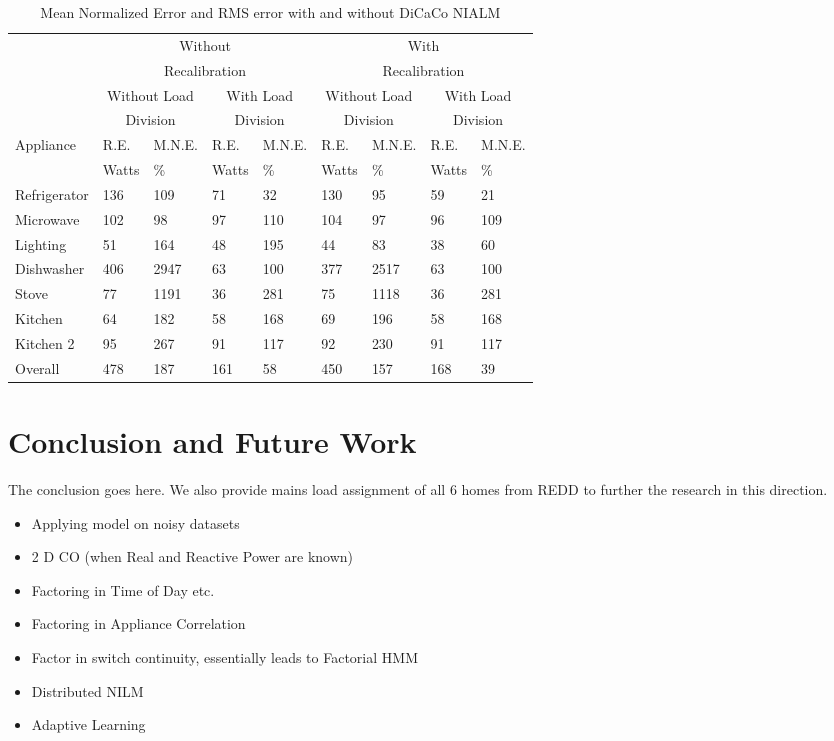 \documentclass[conference]{IEEEtran}
\begin{document}
\begin{table}
\caption{Mean Normalized Error and RMS error with and without DiCaCo NIALM}
\label{tab:results}
\begin{tabular}{|p{30pt}|p{12pt}|p{14pt}|p{12pt}|p{14pt}|p{12pt}|p{14pt}|p{12pt}|p{14pt}|}
\hline
&\multicolumn{4}{|c|}{Without}&\multicolumn{4}{|c|}{With}\\
&\multicolumn{4}{|c|}{Recalibration}&\multicolumn{4}{|c|}{Recalibration}\\
\hline
&\multicolumn{2}{|c|}{Without Load}&\multicolumn{2}{|c|}{With Load}&\multicolumn{2}{|c|}{Without Load}&\multicolumn{2}{|c|}{With Load}\\
&\multicolumn{2}{|c|}{Division}&\multicolumn{2}{|c|}{Division}&\multicolumn{2}{|c|}{Division}&\multicolumn{2}{|c|}{Division}\\
\hline

Appliance &R.E.&M.N.E.& R.E.&M.N.E.&R.E.&M.N.E.&R.E.& M.N.E.\\
&Watts&\%&Watts&\%&Watts&\%&Watts&\%\\
\hline
Refrigerator & 136 &109 & 71 & 32 & 130 &95  &59 &21\\
Microwave    & 102 &98  & 97 & 110& 104 &97  &96 &109\\
Lighting     & 51  &164 & 48 & 195& 44  &83  &38 &60\\
Dishwasher   & 406 &2947& 63 & 100& 377 &2517&63 &100\\
Stove        & 77  &1191& 36 & 281& 75  &1118&36 &281\\
Kitchen      & 64  &182 & 58 & 168& 69  &196 &58 &168\\
Kitchen 2    & 95  &267 & 91 & 117& 92  &230 &91 &117\\
\hline
Overall      &478  &187 &161 &  58& 450 &157 &168&39\\

\hline

\end{tabular}
\end{table}





\section{Conclusion and Future Work}
The conclusion goes here.
We also provide mains load assignment of all 6 homes from REDD to further the research in this direction.

\begin{itemize}

\item Applying model on noisy datasets
\item 2 D CO (when Real and Reactive Power are known)
\item Factoring in Time of Day etc.
\item Factoring in Appliance Correlation
\item Factor in switch continuity, essentially leads to Factorial HMM
\item Distributed NILM
\item Adaptive Learning
\end{itemize}
\end{document}
